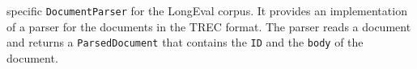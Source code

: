 specific \texttt{DocumentParser} for the LongEval corpus. It provides an implementation of a parser for the documents in the TREC format. The parser reads a document and returns a \texttt{ParsedDocument} that contains the \texttt{ID} and the \texttt{body} of the document.